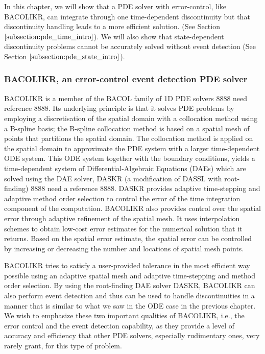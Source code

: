 \documentclass{article}
\begin{document}
In this chapter, we will show that a PDE solver with error-control, like BACOLIKR, can integrate through one time-dependent discontinuity but that discontinuity handling leads to a more efficient solution.
(See Section $\ref{subsection:pde_time_intro}$). We will also show that state-dependent discontinuity problems cannot be accurately solved without event detection (See Section $\ref{subsection:pde_state_intro}$).

\subsubsection{BACOLIKR, an error-control event detection PDE solver}
\label{subsection:pde_software}
BACOLIKR is a member of the BACOL family of 1D PDE solvers 8888 need reference 8888. Its underlying principle is that it solves PDE problems  by employing a discretisation of the spatial domain with a collocation method using a B-spline basis; the B-spline collocation method is based on a spatial mesh of points that partitions the spatial domain. The collocation method is applied on the spatial domain to approximate the PDE system with a larger time-dependent ODE system. This ODE system together with the boundary conditions, yields a time-dependent system of Differential-Algebraic Equations (DAEs) which are solved using the DAE solver, DASKR (a modification of DASSL with root-finding) 8888 need a reference 8888. DASKR provides adaptive time-stepping and adaptive method order selection to control the error of the time integration component of the computation. BACOLIKR also provides control over the spatial error through adaptive refinement of the spatial mesh. It uses interpolation schemes to obtain low-cost error estimates for the numerical solution that it returns. Based on the spatial error estimate, the spatial error can be controlled by increasing or decreasing the number and locations of spatial mesh points.

BACOLIKR tries to satisfy a user-provided tolerance in the most efficient way possible using an adaptive spatial mesh and adaptive time-stepping and method order selection. By using the root-finding DAE solver DASKR, BACOLIKR can also perform event detection and thus can be used to handle discontinuities in a manner that is similar to what we saw in the ODE case in the previous chapter. We wish to emphasize these two important qualities of BACOLIKR, i.e., the error control and the event detection capability, as they provide a level of accuracy and efficiency that other PDE solvers, especially rudimentary ones, very rarely grant, for this type of problem.
\end{document}
